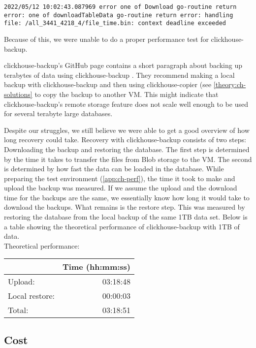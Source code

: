 \texttt{2022/05/12 10:02:43.087969 error one of Download go-routine return error: one of downloadTableData go-routine return error: handling file: /all\_3441\_4218\_4/file\_time.bin: context deadline exceeded}

Because of this, we were unable to do a proper performance test for clickhouse-backup.

clickhouse-backup's GitHub page contains a short paragraph about backing up terabytes of data using clickhouse-backup \cite{akulov_clickhouse-backup_2022-1}. They recommend making a local backup with clickhouse-backup and then using clickhouse-copier (see \ref{theory:ch-solutions} to copy the backup to another VM. This might indicate that clickhouse-backup's remote storage feature does not scale well enough to be used for several terabyte large databases.


Despite our struggles, we still believe we were able to get a good overview of how long recovery could take.
Recovery with clickhouse-backup consists of two steps:
Downloading the backup and restoring the database.
The first step is determined by the time it takes to transfer the files from Blob storage to the VM.
The second is determined by how fast the data can be loaded in the database.
While preparing the test environment (\ref{app:ch-perf}),
the time it took to make and upload the backup was measured.
If we assume the upload and the download time for the backups are the same,
we essentially know how long it would take to download the backups.
What remains is the restore step.
This was measured by restoring the database from the local backup of the same 1TB data set.
Below is a table showing the theoretical performance of clickhouse-backup with 1TB of data.\\

Theoretical performance:
\begin{center}
\begin{tabular}{lr}
\hline
 & Time (hh:mm:ss)\\
\hline
Upload: & 03:18:48\\
Local restore: & 00:00:03\\
Total: & 03:18:51\\
\hline
\end{tabular}
\end{center}

\subsection{Cost}

